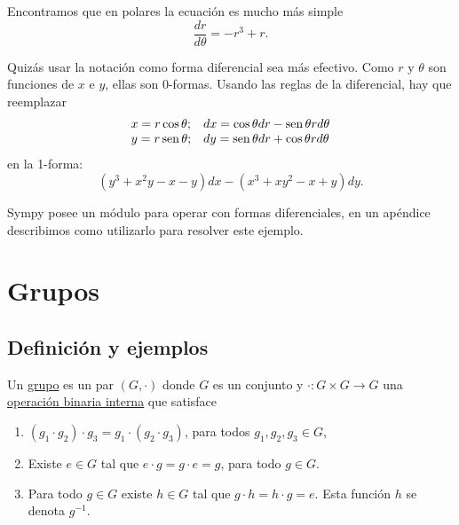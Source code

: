 
 Encontramos que en polares la ecuación es mucho más simple
\[\frac{dr}{d\theta}=-r^3+r.\]

 Quizás  usar la notación como  forma diferencial sea más efectivo. Como $r$ y $\theta$ son funciones de $x$ e $y$, ellas son 0-formas. Usando las reglas de la diferencial, hay que reemplazar
\[
\begin{array}{ll}
x=r\cos\theta; &dx=\cos\theta dr-\operatorname{sen}\theta r d\theta\\
 y= r\operatorname{sen}\theta; & dy=\operatorname{sen}\theta dr+\cos\theta r d\theta\\
\end{array}
\]
en la 1-forma:
\[(y^3+x^2y-x-y)dx-(x^3+xy^2-x+y)dy.\]

Sympy posee un módulo para operar con formas diferenciales, en un apéndice describimos como utilizarlo para resolver este ejemplo.

\section{Grupos}

 \subsection{Definición y ejemplos}
\begin{definicion}[Grupo]
Un \href{https://es.wikipedia.org/wiki/Grupo_(matem%C3%A1tica)}{grupo} es un par $(G,\cdot)$ donde $G$ es un conjunto y $\cdot :G\times G\to G$ una \href{https://es.wikipedia.org/wiki/Operaci%C3%B3n_matem%C3%A1tica}{operación binaria interna} que satisface
\begin{enumerate}
\item $(g_1\cdot g_2)\cdot g_3=g_1\cdot (g_2\cdot g_3)$, para todos $g_1,g_2,g_3\in G$,
\item Existe $e\in G$ tal que $e\cdot g=g\cdot e=g$,  para todo $g\in G$.
\item Para todo $g\in G$ existe $h\in G$ tal que $g\cdot h=h\cdot g=e$. Esta función $h$ se denota  $g^{-1}$.
\end{enumerate}
\end{definicion}

